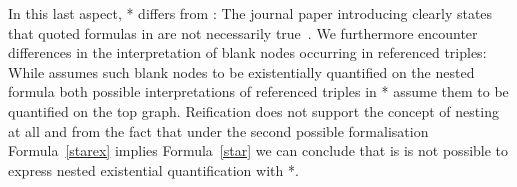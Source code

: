 In this last aspect, \rdf{}* differs from \nthree: The journal paper introducing \nthree clearly states that quoted formulas in \nthree are not necessarily true~\cite[p 11]{N3Logic}. 
We furthermore encounter differences in the interpretation of blank nodes occurring in referenced triples: While \nthree assumes such blank nodes to be existentially quantified 
on the nested formula both possible interpretations of referenced triples in \rdf{}* assume them to be quantified on the top graph.
% 
% 
% 
Reification does not support the concept of nesting at all and from the fact that under the second possible formalisation
Formula~\ref{starex} implies Formula~\ref{star} we can conclude that is is not possible to express nested existential quantification with \rdf{}*.
% 
